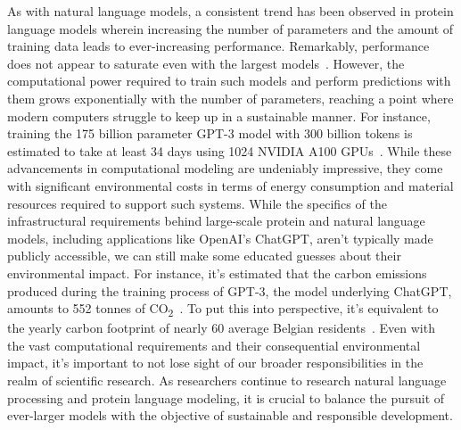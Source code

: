 As with natural language models, a consistent trend has been observed in protein language models wherein increasing the number of parameters and the amount of training data leads to ever-increasing performance. Remarkably, performance does not appear to saturate even with the largest models~\cite{Ofer}. However, the computational power required to train such models and perform predictions with them grows exponentially with the number of parameters, reaching a point where modern computers struggle to keep up in a sustainable manner. For instance, training the 175 billion parameter GPT-3 model with 300 billion tokens is estimated to take at least 34 days using 1024 NVIDIA A100 GPUs~\cite{gptrain}. While these advancements in computational modeling are undeniably impressive, they come with significant environmental costs in terms of energy consumption and material resources required to support such systems. While the specifics of the infrastructural requirements behind large-scale protein and natural language models, including applications like OpenAI's ChatGPT, aren't typically made publicly accessible, we can still make some educated guesses about their environmental impact. For instance, it's estimated that the carbon emissions produced during the training process of GPT-3, the model underlying ChatGPT, amounts to 552 tonnes of CO\textsubscript{2}~\cite{co2}. To put this into perspective, it's equivalent to the yearly carbon footprint of nearly 60 average Belgian residents~\cite{ghg}. Even with the vast computational requirements and their consequential environmental impact, it's important to not lose sight of our broader responsibilities in the realm of scientific research. As researchers continue to research natural language processing and protein language modeling, it is crucial to balance the pursuit of ever-larger models with the objective of sustainable and responsible development.